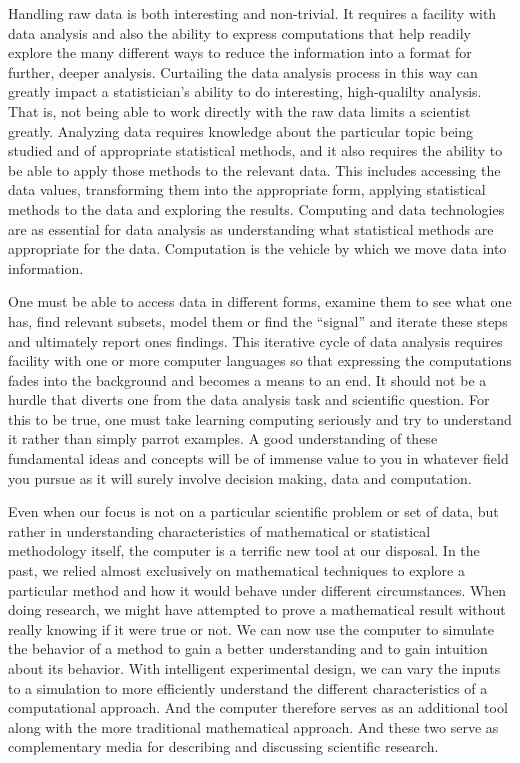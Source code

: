 Handling raw data is both interesting and non-trivial.  It requires a
facility with data analysis and also the ability to express
computations that help readily explore the many different ways to
reduce the information into a format for further, deeper analysis.
Curtailing the data analysis process in this way can greatly impact a
statistician's ability to do interesting, high-qualilty analysis.
That is, not being able to work directly with the raw data limits a
scientist greatly.  Analyzing data requires knowledge about the
particular topic being studied and of appropriate statistical methods,
and it also requires the ability to be able to apply those methods to
the relevant data.  This includes accessing the data values,
transforming them into the appropriate form, applying statistical
methods to the data and exploring the results.  Computing and data
technologies are as essential for data analysis as understanding what
statistical methods are appropriate for the data.  Computation is the
vehicle by which we move data into information.

One must be able to access data in different forms, examine them to
see what one has, find relevant subsets, model them or find the
``signal'' and iterate these steps and ultimately report ones
findings.  This iterative cycle of data analysis requires facility
with one or more computer languages so that expressing the
computations fades into the background and becomes a means to an
end. It should not be a hurdle that diverts one from the data analysis
task and scientific question.  For this to be true, one must take
learning computing seriously and try to understand it rather than
simply parrot examples. A good understanding of these fundamental
ideas and concepts will be of immense value to you in whatever field
you pursue as it will surely involve decision making, data and
computation.


Even when our focus is not on a particular scientific problem or set
of data, but rather in understanding characteristics of mathematical
or statistical methodology itself, the computer is a terrific new tool
at our disposal.  In the past, we relied almost exclusively on
mathematical techniques to explore a particular method and how it
would behave under different circumstances.  When doing research, we
might have attempted to prove a mathematical result without really
knowing if it were true or not.  We can now use the computer to
simulate the behavior of a method to gain a better understanding and
to gain intuition about its behavior.  With intelligent experimental
design, we can vary the inputs to a simulation to more efficiently
understand the different characteristics of a computational approach.
And the computer therefore serves as an additional tool along with the
more traditional mathematical approach.  And these two serve as
complementary media for describing and discussing scientific research.



